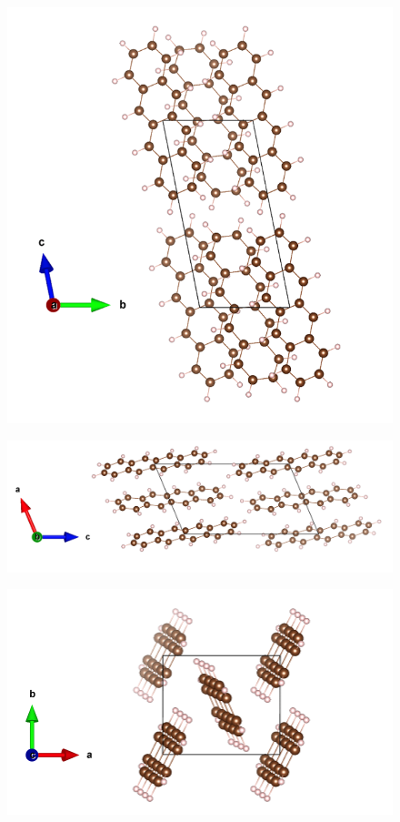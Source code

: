  \begin{figure}[h]
 	\centering
 	\includegraphics[scale=0.7]{image/T-a}
 \end{figure}
 
 \begin{figure}[h]
 	\centering
 	\includegraphics[scale=0.7]{image/T-b}
 \end{figure}
 
 \begin{figure}[h]
 	\centering
 	\includegraphics[scale=0.7]{image/T-c}
 \end{figure}
 

